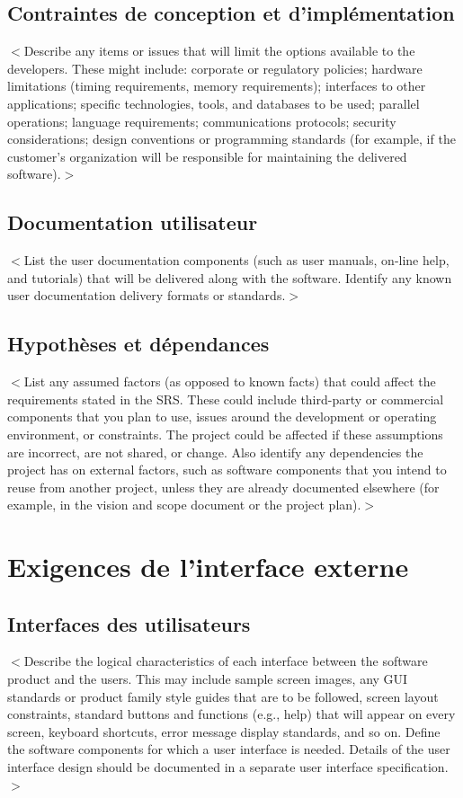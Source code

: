 \documentclass[titlepage]{report}
\begin{document}
\section{Contraintes de conception et d'implémentation}
$<$Describe any items or issues that will limit the options available to the 
developers. These might include: corporate or regulatory policies; hardware 
limitations (timing requirements, memory requirements); interfaces to other 
applications; specific technologies, tools, and databases to be used; parallel 
operations; language requirements; communications protocols; security 
considerations; design conventions or programming standards (for example, if the 
customer’s organization will be responsible for maintaining the delivered 
software).$>$

\section{Documentation utilisateur}
$<$List the user documentation components (such as user manuals, on-line help, 
and tutorials) that will be delivered along with the software. Identify any 
known user documentation delivery formats or standards.$>$

\section{Hypothèses et dépendances}

$<$List any assumed factors (as opposed to known facts) that could affect the 
requirements stated in the SRS. These could include third-party or commercial 
components that you plan to use, issues around the development or operating 
environment, or constraints. The project could be affected if these assumptions 
are incorrect, are not shared, or change. Also identify any dependencies the 
project has on external factors, such as software components that you intend to 
reuse from another project, unless they are already documented elsewhere (for 
example, in the vision and scope document or the project plan).$>$


\chapter{Exigences de l'interface externe}

\section{Interfaces des utilisateurs}
$<$Describe the logical characteristics of each interface between the software 
product and the users. This may include sample screen images, any GUI standards 
or product family style guides that are to be followed, screen layout 
constraints, standard buttons and functions (e.g., help) that will appear on 
every screen, keyboard shortcuts, error message display standards, and so on.  
Define the software components for which a user interface is needed. Details of 
the user interface design should be documented in a separate user interface 
specification.$>$
\end{document}
